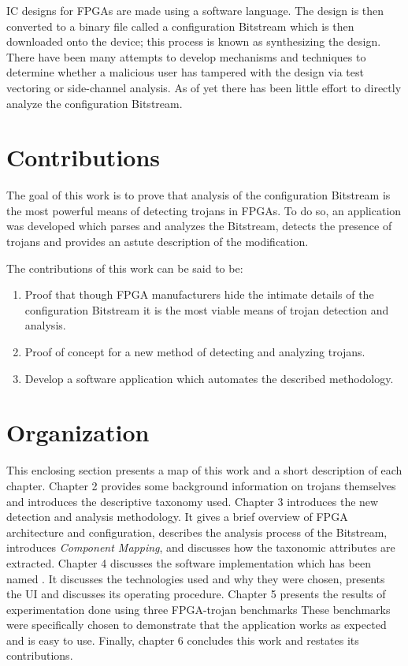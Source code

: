 \acrshort{IC} designs for \acrfull{FPGAs} are made using a software language.
The design is then converted to a binary file called a configuration \gls{Bitstream} which is then downloaded onto the device; this process is known as synthesizing the design.
There have been many attempts to develop mechanisms and techniques to determine whether a malicious user has tampered with the design via test vectoring or side-channel analysis.
As of yet there has been little effort to directly analyze the configuration \gls{Bitstream}.
\section{Contributions}
The goal of this work is to prove that analysis of the configuration \gls{Bitstream} is the most powerful means of detecting trojans in \acrshort{FPGA}s.
To do so, an application was developed which parses and analyzes the \gls{Bitstream}, detects the presence of trojans and provides an astute description of the modification.

The contributions of this work can be said to be:
\begin{enumerate}
	\item Proof that though \acrshort{FPGA} manufacturers hide the intimate details of the configuration \gls{Bitstream} it is the most viable means of trojan detection and analysis. 
	\item Proof of concept for a new method of detecting and analyzing trojans.
	\item Develop a software application which automates the described methodology.
\end{enumerate}
\section{Organization}
This enclosing section presents a map of this work and a short description of each chapter.
Chapter 2 provides some background information on trojans themselves and introduces the descriptive taxonomy used.
Chapter 3 introduces the new detection and analysis methodology.
It gives a brief overview of \acrshort{FPGA} architecture and configuration, describes the analysis process of the \gls{Bitstream}, introduces \textit{Component Mapping}, and discusses how the taxonomic attributes are extracted.
Chapter 4 discusses the software implementation which has been named \Name.
It discusses the technologies used and why they were chosen, presents the \acrlong{UI} and discusses its operating procedure.
Chapter 5 presents the results of experimentation done using three \acrshort{FPGA}-trojan benchmarks
These benchmarks were specifically chosen to demonstrate that the application works as expected and is easy to use.
Finally, chapter 6 concludes this work and restates its contributions.